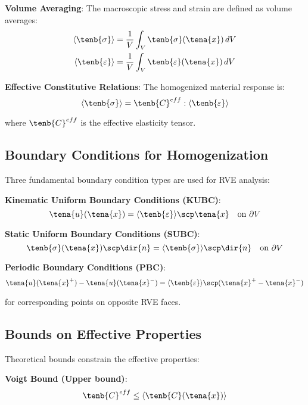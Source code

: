 \textbf{Volume Averaging}:
The macroscopic stress and strain are defined as volume averages:
\begin{align}
\langle \tenb{\sigma} \rangle &= \frac{1}{V} \int_V \tenb{\sigma}(\tena{x}) \, dV\\
\langle \tenb{\varepsilon} \rangle &= \frac{1}{V} \int_V \tenb{\varepsilon}(\tena{x}) \, dV
\end{align}

\textbf{Effective Constitutive Relations}:
The homogenized material response is:
\begin{equation}
\langle \tenb{\sigma} \rangle = \tenb{C}^{eff} : \langle \tenb{\varepsilon} \rangle
\end{equation}

where $\tenb{C}^{eff}$ is the effective elasticity tensor.

\subsection{Boundary Conditions for Homogenization}

Three fundamental boundary condition types are used for RVE analysis:

\textbf{Kinematic Uniform Boundary Conditions (KUBC)}:
\begin{equation}
\tena{u}(\tena{x}) = \langle \tenb{\varepsilon} \rangle \scp \tena{x} \quad \text{on } \partial V
\end{equation}

\textbf{Static Uniform Boundary Conditions (SUBC)}:
\begin{equation}
\tenb{\sigma}(\tena{x}) \scp \dir{n} = \langle \tenb{\sigma} \rangle \scp \dir{n} \quad \text{on } \partial V
\end{equation}

\textbf{Periodic Boundary Conditions (PBC)}:
\begin{equation}
\tena{u}(\tena{x}^+) - \tena{u}(\tena{x}^-) = \langle \tenb{\varepsilon} \rangle \scp (\tena{x}^+ - \tena{x}^-)
\end{equation}

for corresponding points on opposite RVE faces.

\subsection{Bounds on Effective Properties}

Theoretical bounds constrain the effective properties:

\textbf{Voigt Bound (Upper bound)}:
\begin{equation}
\tenb{C}^{eff} \leq \langle \tenb{C}(\tena{x}) \rangle
\end{equation}

